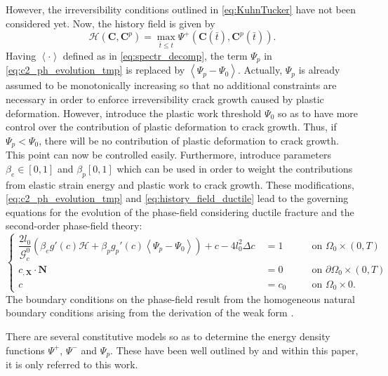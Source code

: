 However, the irreversibility conditions outlined in \eqref{eq:KuhnTucker} have not been considered yet. Now, the history field is given by
\begin{equation} \label{eq:history_field_ductile}
	\mathcal{H}\left(\mathbf{C},\mathbf{C}^{p}\right) = \max\limits_{\bar{t}\leq t} \Psi^{+}\left(\mathbf{C}\left(\bar{t}\right),\mathbf{C}^{p}\left(\bar{t}\right)\right).
\end{equation}
Having $\left<\cdot\right>$ defined as in \eqref{eq:spectr_decomp}, the term $\Psi_{p}$ in \eqref{eq:c2_ph_evolution_tmp} is replaced by $\left<\Psi_{p}-\Psi_{0}\right>$. Actually, $\Psi_{p}$ is already assumed to be monotonically increasing so that no additional constraints are necessary in order to enforce irreversibility crack growth caused by plastic deformation. However, \citet{03_PF_ductile} introduce the plastic work threshold $\Psi_{0}$ so as to have more control over the contribution of plastic deformation to crack growth. Thus, if $\Psi_{p}<\Psi_{0}$, there will be no contribution of plastic deformation to crack growth. This point can now be controlled easily. Furthermore, \citet{03_PF_ductile} introduce parameters $\beta_{e}\in\left[0,1\right]$ and $\beta_{p}\left[0,1\right]$ which can be used in order to weight the contributions from elastic strain energy and plastic work to crack growth. These modifications, \eqref{eq:c2_ph_evolution_tmp} and \eqref{eq:history_field_ductile} lead to the governing equations for the evolution of the phase-field considering ductile fracture and the second-order phase-field theory:
\begin{equation} \label{eq:c2_equil_ductile}
	\left\{\begin{alignedat}{2}
		\dfrac{2l_{0}}{\mathcal{G}_{c}^{0}}\left(\beta_{e}g'\left(c\right)\mathcal{H}+\beta_{p}g_{p}'\left(c\right)\left<\Psi_{p}-\Psi_{0}\right>\right) + c - 4l_{0}^{2}\Delta c\ &= 1 && \quad\text{on } \Omega_{0}\times\left(0,T\right) \\
		c_{,\mathbf{X}}\cdot\mathbf{N} &= 0 && \quad \text{on } \partial\Omega_{0}\times\left(0,T\right) \\
		c &= c_{0} && \quad \text{on } \Omega_{0}\times0.
	\end{alignedat}\right.
\end{equation}
The boundary conditions on the phase-field result from the homogeneous natural boundary conditions arising from the derivation of the weak form \citep{11_PF_DissBorden}.

There are several constitutive models so as to determine the energy density functions $\Psi^{+}$, $\Psi^{-}$ and $\Psi_{p}$. These have been well outlined by \citet{03_PF_ductile} and within this paper, it is only referred to this work. 

